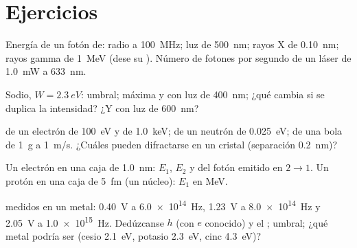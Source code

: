 \section{Ejercicios}

\begin{exercise}[$\star$]\label{exo:b1:quantum-introduction:1}
Energía de un fotón de: radio a \qty{100}{MHz}; luz de \qty{500}{nm};
rayos X de \qty{0.10}{nm}; rayos gamma de \qty{1}{MeV} (dese su ). Número de fotones por segundo de un láser de \qty{1.0}{mW} a
\qty{633}{nm}.
\end{exercise}

\begin{exercise}[$\star$]\label{exo:b1:quantum-introduction:2}
Sodio, $W = \qty{2.3}{eV}$:  umbral; 
máxima y  con luz de \qty{400}{nm}; ¿qué cambia si se
duplica la intensidad? ¿Y con luz de \qty{600}{nm}?
\end{exercise}

\begin{exercise}[$\star$]\label{exo:b1:quantum-introduction:3}
 de un electrón de \qty{100}{eV} y de
\qty{1.0}{keV}; de un neutrón de \qty{0.025}{eV}; de una bola de \qty{1}{g}
a \qty{1}{m/s}. ¿Cuáles pueden difractarse en un cristal (separación
\qty{0.2}{nm})?
\end{exercise}

\begin{exercise}[$\star$]\label{exo:b1:quantum-introduction:4}
Un electrón en una caja de \qty{1.0}{nm}: $E_1$, $E_2$ y 
del fotón emitido en $2 \to 1$. Un protón en una caja de \qty{5}{fm}
(un núcleo): $E_1$ en \unit{MeV}.
\end{exercise}

\begin{exercise}[$\star\star$]\label{exo:b1:quantum-introduction:5}
 medidos en un metal: \qty{0.40}{V} a
\qty{6.0e14}{Hz}, \qty{1.23}{V} a \qty{8.0e14}{Hz} y \qty{2.05}{V} a
\qty{1.0e15}{Hz}. Dedúzcanse $h$ (con $e$ conocido) y el ;  umbral; ¿qué metal podría ser (cesio
\qty{2.1}{eV}, potasio \qty{2.3}{eV}, cinc \qty{4.3}{eV})?
\end{exercise}

